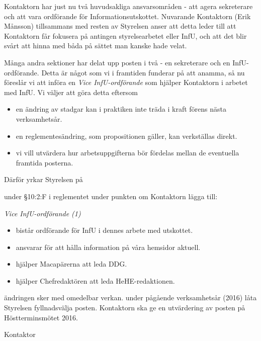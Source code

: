 \documentclass[../main/handlingar.tex]{subfiles}
\begin{document}

Kontaktorn har just nu två huvudsakliga ansvarsområden - att agera sekreterare och att vara ordförande för Informationsutskottet. Nuvarande Kontaktorn (Erik Månsson) tillsammans med resten av Styrelsen anser att detta leder till att Kontaktorn får fokusera på antingen styrelsearbetet eller InfU, och att det blir svårt att hinna med båda på sättet man kanske hade velat.

Många andra sektioner har delat upp posten i två - en sekreterare och en InfU-ordförande. Detta är något som vi i framtiden funderar på att anamma, så nu föreslår vi att införa en \emph{Vice InfU-ordförande} som hjälper Kontaktorn i arbetet med InfU. Vi väljer att göra detta eftersom
\begin{itemize}[label={--}, topsep=0cm, noitemsep]
    \item en ändring av stadgar kan i praktiken inte träda i kraft förens nästa verksamhetsår.
    \item en reglementesändring, som propositionen gäller, kan verkställas direkt.
    \item vi vill utvärdera hur arbetsuppgifterna bör fördelas mellan de eventuella framtida posterna.
\end{itemize}

Därför yrkar Styrelsen på
\begin{attsatser}
    \att under \S10:2:F i reglementet under punkten om Kontaktorn lägga till:\par
    {\it
    Vice InfU-ordförande (1)
    \begin{itemize}[label={--}, topsep=0cm, noitemsep]
        \item bistår ordförande för InfU i dennes arbete med utskottet.
        \item ansvarar för att hålla information på våra hemsidor aktuell.
        \item hjälper Macapärerna att leda DDG.
        \item hjälper Chefredaktören att leda HeHE-redaktionen.
    \end{itemize}
    }
    \att ändringen sker med omedelbar verkan.
    \att under pågående verksamhetsår (2016) låta Styrelsen fyllnadsvälja posten.
    \att Kontaktorn ska ge en utvärdering av posten på Höstterminsmötet 2016.
\end{attsatser}

\begin{signatures}{1}
    \ist
    \signature{Erik Månsson}{Kontaktor}
\end{signatures}
\end{document}
